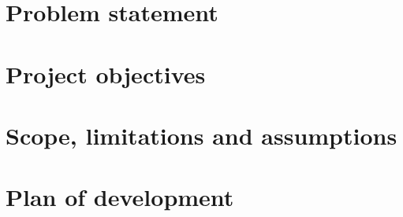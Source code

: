 

\section{Problem statement}
\label{sec:ch1.problemstatement}



\section{Project objectives}
\label{sec:ch1.projectobjectives}
\section{Scope, limitations and assumptions}
\label{sec:ch1.scope}
\section{Plan of development}
\label{sec:ch1.planofdevelopment}
\pagebreak
